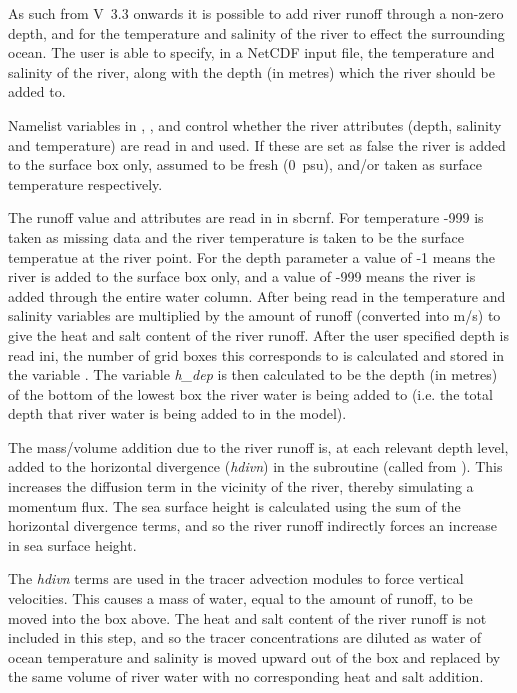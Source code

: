 \documentclass[../tex_main/NEMO_manual]{subfiles}
\begin{document}
As such from V~3.3 onwards it is possible to add river runoff through a non-zero depth, and for the 
temperature and salinity of the river to effect the surrounding ocean.
The user is able to specify, in a NetCDF input file, the temperature and salinity of the river, along with the   
depth (in metres) which the river should be added to.

Namelist variables in , ,  and  control whether 
the river attributes (depth, salinity and temperature) are read in and used.  If these are set 
as false the river is added to the surface box only, assumed to be fresh (0~psu), and/or 
taken as surface temperature respectively.

The runoff value and attributes are read in in sbcrnf.  
For temperature -999 is taken as missing data and the river temperature is taken to be the 
surface temperatue at the river point.
For the depth parameter a value of -1 means the river is added to the surface box only, 
and a value of -999 means the river is added through the entire water column. 
After being read in the temperature and salinity variables are multiplied by the amount of runoff (converted into m/s) 
to give the heat and salt content of the river runoff.
After the user specified depth is read ini, the number of grid boxes this corresponds to is 
calculated and stored in the variable .
The variable \textit{h\_dep} is then calculated to be the depth (in metres) of the bottom of the 
lowest box the river water is being added to (i.e. the total depth that river water is being added to in the model).

The mass/volume addition due to the river runoff is, at each relevant depth level, added to the horizontal divergence 
(\textit{hdivn}) in the subroutine  (called from ).
This increases the diffusion term in the vicinity of the river, thereby simulating a momentum flux.
The sea surface height is calculated using the sum of the horizontal divergence terms, and so the 
river runoff indirectly forces an increase in sea surface height. 

The \textit{hdivn} terms are used in the tracer advection modules to force vertical velocities.
This causes a mass of water, equal to the amount of runoff, to be moved into the box above. 
The heat and salt content of the river runoff is not included in this step, and so the tracer 
concentrations are diluted as water of ocean temperature and salinity is moved upward out of the box 
and replaced by the same volume of river water with no corresponding heat and salt addition.
\end{document}

